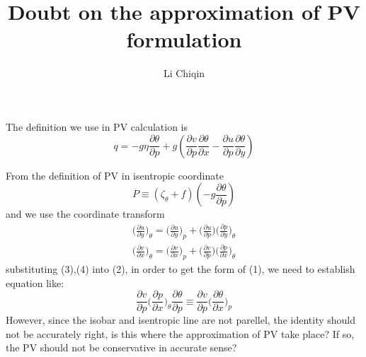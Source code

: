 \documentclass[12pt]{article}
\begin{document}
\title{Doubt on the approximation of PV formulation}
\author{Li Chiqin}
\maketitle

The definition we use in PV calculation is
\begin{equation}
    q = -g\eta\frac{\partial{\theta}}{\partial{p}} + g(\frac{\partial{v}}{\partial{p}}
    \frac{\partial{\theta}}{\partial{x}} - \frac{\partial{u}}{\partial{p}} \frac{\partial{\theta}}{\partial{y}})
\end{equation}

From the definition of PV in isentropic coordinate
\begin{equation}
    P \equiv (\zeta_{\theta} + f)(-g \frac{\partial{\theta}}{\partial{p}})
\end{equation}
and we use the coordinate transform
\begin{gather}
    \Big(\frac{\partial{u}}{\partial{y}}\Big)_{\theta} = \Big(\frac{\partial{u}}{\partial{y}}\Big)_{p}
    + \Big(\frac{\partial{u}}{\partial{p}}\Big) \Big(\frac{\partial{p}}{\partial{y}}\Big)_{\theta}\\
    \Big(\frac{\partial{v}}{\partial{x}}\Big)_{\theta} = \Big(\frac{\partial{v}}{\partial{x}}\Big)_{p}
    + \Big(\frac{\partial{v}}{\partial{p}}\Big) \Big(\frac{\partial{p}}{\partial{x}}\Big)_{\theta}
\end{gather}
substituting (3),(4) into (2), in order to get the form of (1), we need to establish equation like:
\begin{equation}
    \frac{\partial{v}}{\partial{p}} \Big(\frac{\partial{p}}{\partial{x}}\Big)_{\theta}
    \frac{\partial{\theta}}{\partial{p}} \equiv \frac{\partial{v}}{\partial{p}} \Big(\frac{\partial{\theta}}{\partial{x}}\Big)_{p}
\end{equation}
However, since the isobar and isentropic line are not parellel, the identity should not be accurately right,
is this where the approximation of PV take place? If so, the PV should not be conservative in accurate sense?
\end{document}
